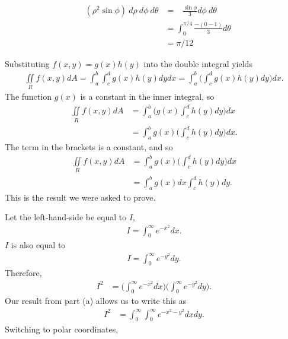 \begin{align*}
  \mathop{\int_0^{\pi/4} \!\! \int_{0}^{\pi/2} \!\! \int_0^1 } ( \rho^2 \sin\phi ) \ d\rho\  d\phi\  d\theta
  &=   \mathop{\int_0^{\pi/4} \!\! \int_{0}^{\pi/2} }  \frac{ \sin\phi}{3}  d\phi\  d\theta\\
  &=   \int_0^{\pi/4} \frac{-(0-1)}{3}   d\theta \\
  &=  \pi/12
\end{align*}
\item %
\BEN
\item
Substituting $f(x,y) = g(x)h(y)$ into the double integral yields
\begin{align*}
   \iint\limits_{R} f(x,y) dA 
   =  \int_a^b  \int_c^d g(x) h(y) dydx 
   =  \int_a^b \Bigg( \int_c^d g(x) h(y) dy \Bigg) dx .
\end{align*}
The function $g(x)$ is a constant in the inner integral, so
\begin{align*}
   \iint\limits_{R} f(x,y) dA 
   &=  \int_a^b  \Bigg( g(x)\int_c^d h(y) dy \Bigg) dx \\
   &=  \int_a^b   g(x) \Bigg(\int_c^d h(y) dy \Bigg) dx .
\end{align*}
The term in the brackets is a constant, and so 
\begin{align*}
   \iint\limits_{R} f(x,y) dA 
   &=  \int_a^b   g(x) \Bigg(\int_c^d h(y) dy \Bigg) dx \\
   &=  \int_a^b   g(x) dx \int_c^d h(y) dy.
\end{align*}
This is the result we were asked to prove.
\item Let the left-hand-side be equal to $I$,
\begin{align*}
   I=\int_{0}^{\infty} e^{-x^2} dx.
\end{align*}
$I$ is also equal to
\begin{align*}
   I=\int_{0}^{\infty} e^{-y^2} dy.
\end{align*}
Therefore,
\begin{align*}
  I^2 &= \Bigg(\int_{0}^{\infty} e^{-x^2} dx\Bigg)\Bigg(\int_{0}^{\infty} e^{-y^2} dy\Bigg).
\end{align*}
Our result from part (a) allows us to write this as
\begin{align*}
  I^2 &= \int_{0}^{\infty} \int_{0}^{\infty} e^{-x^2-y^2} dxdy.
\end{align*}
Switching to polar coordinates,
